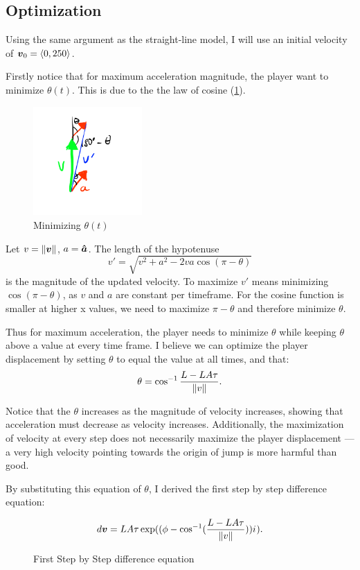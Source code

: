 \subsection{Optimization}
Using the same argument as the straight-line model, I will use an initial velocity of $\boldsymbol{v}_0 = \left\langle 0, 250 \right\rangle$.

Firstly notice that for maximum acceleration magnitude, the player want to minimize $\theta(t)$. This is due to the the law of cosine (\ref{fig:min_theta}).

\begin{figure}
    \includegraphics[width=0.37\textwidth,right]{assets/min_theta.png}
    \caption{Minimizing $\theta(t)$}
    \label{fig:min_theta}
\end{figure}

Let $v = \|\boldsymbol{v}\|$, $a = \boldsymbol{\hat{a}}$. The length of the hypotenuse
\[
    v' = \sqrt{v^2 + a^2 -2 va \cos (\pi - \theta)}
\]
is the magnitude of the updated velocity. To maximize $v'$ means minimizing $\cos(\pi - \theta)$, as $v$ and $a$ are constant per timeframe. For the cosine function is smaller at higher x values, we need to maximize $\pi - \theta$ and therefore minimize $\theta$.

Thus for maximum acceleration, the player needs to minimize $\theta$ while keeping $\theta$ above a value at every time frame. I believe we can optimize the player displacement by setting $\theta$ to equal the value at all times, and that:
\[
    \theta = \cos^{-1} \frac{L-LA\tau}{\|v\|}.
\]

Notice that the $\theta$ increases as the magnitude of velocity increases, showing that acceleration must decrease as velocity increases. Additionally, the maximization of velocity at every step does not necessarily maximize the player displacement --- a very high velocity pointing towards the origin of jump is more harmful than good.

By substituting this equation of $\theta$, I derived the first step by step difference equation:
\begin{figure}[H]
    \centering
    \[
        d\boldsymbol{v} = LA\tau \exp((\phi - \cos^{-1}(\frac{L-LA\tau}{\|v\|})) {i\mkern1mu}).
    \]
    \caption{First Step by Step difference equation}
    \label{fig:sbs}
\end{figure}

